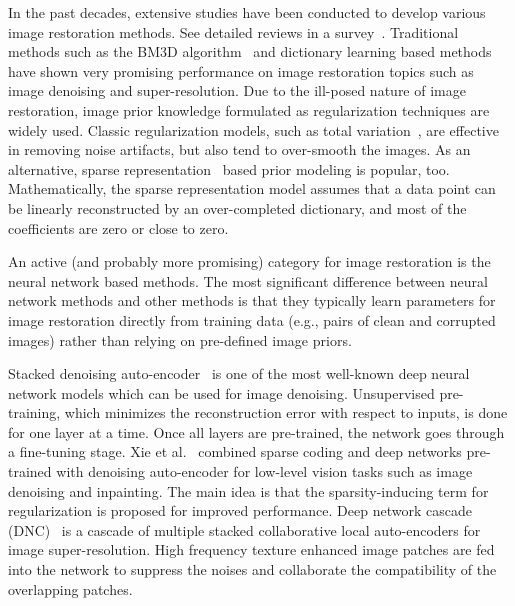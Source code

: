 \documentclass[10pt,journal,compsoc]{IEEEtran}
\begin{document}
In the past decades, extensive studies have been conducted to develop various
 image restoration methods. See detailed reviews in a survey~\cite{DBLP:journals/spm/Milanfar13}.
Traditional methods such as the BM3D algorithm~\cite{DBLP:journals/tip/DabovFKE07}
and dictionary learning based methods~\cite{DBLP:journals/tip/WangYWCYH15,
DBLP:conf/iccv/GuZXMFZ15,DBLP:journals/tip/ChatterjeeM09} have shown very promising
performance on image restoration topics such as image denoising and super-resolution.
Due to the ill-posed nature of image restoration, image prior knowledge formulated
as regularization techniques are widely used. Classic regularization models, such as
total variation~\cite{Rudin:1992:NTV:142273.142312,Chan05TV,Oli09TV}, are effective
in removing noise artifacts, but also tend to over-smooth the images. As an alternative,
sparse representation~\cite{DBLP:journals/tip/EladA06,DBLP:journals/tip/DongZSL13,
DBLP:journals/tip/DongZSW11,DBLP:journals/pami/KimK10,DBLP:journals/tip/YangWHM10} based
prior modeling is   popular, too. Mathematically, the sparse representation model
assumes that a data point  can be linearly reconstructed by an over-completed dictionary,
and most of the coefficients are zero or close to zero.

An active (and probably more promising) category for image restoration is the neural
network based methods. The most significant difference between neural network methods
and other methods is that they typically learn parameters for image restoration directly
from training data (e.g., pairs of clean and corrupted images) rather than relying on
pre-defined image priors.


Stacked denoising auto-encoder~\cite{DBLP:conf/icml/VincentLBM08} is one of the most well-known
deep neural network models which can be used for image denoising. Unsupervised pre-training,
which minimizes the reconstruction error with respect to inputs, is done for one layer at a time.
Once all layers are pre-trained, the network goes through a fine-tuning stage. Xie et al.~\cite{DBLP:conf/nips/XieXC12}
combined sparse coding and deep networks pre-trained with denoising auto-encoder for
low-level vision tasks such as image denoising and inpainting. The main idea is that the
sparsity-inducing term for regularization is proposed for improved performance. Deep network
cascade (DNC)~\cite{DBLP:conf/eccv/CuiCSZC14} is a cascade of multiple stacked collaborative
local auto-encoders for image super-resolution.  High frequency texture enhanced image patches are fed
into the network to suppress the noises and collaborate the compatibility of the overlapping patches.
\end{document}
